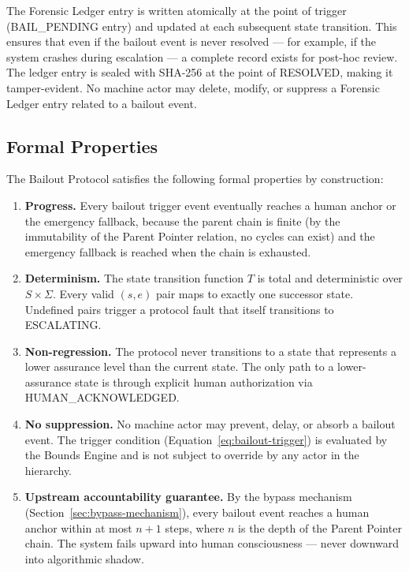 The Forensic Ledger entry is written atomically at the point of trigger (BAIL\_PENDING entry) and updated at each subsequent state transition. This ensures that even if the bailout event is never resolved — for example, if the system crashes during escalation — a complete record exists for post-hoc review. The ledger entry is sealed with SHA-256 at the point of RESOLVED, making it tamper-evident. No machine actor may delete, modify, or suppress a Forensic Ledger entry related to a bailout event.

\subsection{Formal Properties}
\label{sec:bailout-formal-properties}

The Bailout Protocol satisfies the following formal properties by construction:

\begin{enumerate}
    \item \textbf{Progress.} Every bailout trigger event eventually reaches a human anchor or the emergency fallback, because the parent chain is finite (by the immutability of the Parent Pointer relation, no cycles can exist) and the emergency fallback is reached when the chain is exhausted.

    \item \textbf{Determinism.} The state transition function $T$ is total and deterministic over $S \times \Sigma$. Every valid $(s, e)$ pair maps to exactly one successor state. Undefined pairs trigger a protocol fault that itself transitions to ESCALATING.

    \item \textbf{Non-regression.} The protocol never transitions to a state that represents a lower assurance level than the current state. The only path to a lower-assurance state is through explicit human authorization via HUMAN\_ACKNOWLEDGED.

    \item \textbf{No suppression.} No machine actor may prevent, delay, or absorb a bailout event. The trigger condition (Equation~\ref{eq:bailout-trigger}) is evaluated by the Bounds Engine and is not subject to override by any actor in the hierarchy.

    \item \textbf{Upstream accountability guarantee.} By the bypass mechanism (Section~\ref{sec:bypass-mechanism}), every bailout event reaches a human anchor within at most $n + 1$ steps, where $n$ is the depth of the Parent Pointer chain. The system fails upward into human consciousness — never downward into algorithmic shadow.
\end{enumerate}